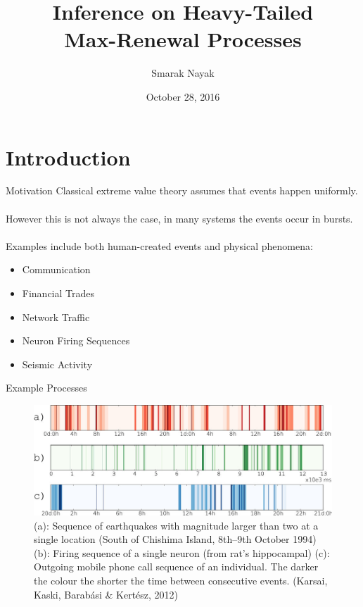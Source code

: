\documentclass{beamer}
\title{Inference on Heavy-Tailed\\ Max-Renewal Processes}
\author{Smarak Nayak}
\date{October 28, 2016}
\begin{document}
 
\frame{\titlepage}
\section{Introduction}

\begin{frame}{Motivation}
	Classical extreme value theory assumes that events happen uniformly. \\~\\
	
	However this is not always the case, in many systems the events occur in bursts. \\~\\
	
	Examples include both human-created events and physical phenomena:
		\begin{itemize}
		\item Communication
		\item Financial Trades 
		\item Network Traffic
		\item Neuron Firing Sequences
		\item Seismic Activity
	    \end{itemize}
	
\end{frame}

\begin{frame}{Example Processes}
	
    \begin{figure}
        \centering
        \includegraphics[scale=1.4]{BurstyGraphs}
        \caption{(a): Sequence of earthquakes with magnitude larger than two at a single location (South of Chishima Island, 8th–9th October 1994) (b): Firing sequence of a single neuron (from rat's hippocampal) (c): Outgoing mobile phone call sequence of an individual. The darker the colour the shorter the time between consecutive events. (Karsai, Kaski, Barabási \& Kertész, 2012)}
    \end{figure}
\end{frame}
 
\end{document}
